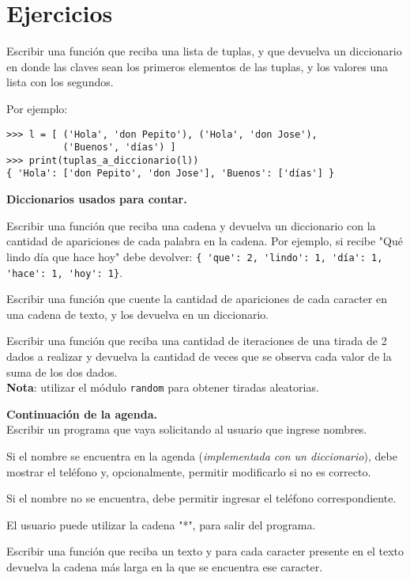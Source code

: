 \newpage
\section{Ejercicios}

\begin{ejercicio}
Escribir una función que reciba una lista de tuplas, y que devuelva
un diccionario en donde las claves sean los primeros elementos de las
tuplas, y los valores una lista con los segundos.

Por ejemplo:
\begin{lstlisting}[numbers=none]
>>> l = [ ('Hola', 'don Pepito'), ('Hola', 'don Jose'),
          ('Buenos', 'días') ]
>>> print(tuplas_a_diccionario(l))
{ 'Hola': ['don Pepito', 'don Jose'], 'Buenos': ['días'] }
\end{lstlisting}
\end{ejercicio}

\begin{ejercicio}
{\bf Diccionarios usados para contar.}
\begin{partes}
  \item Escribir una función que reciba una cadena y devuelva un diccionario con
la cantidad de apariciones de cada palabra en la cadena.  Por ejemplo, si
recibe "Qué lindo día que hace hoy" debe devolver:
\lstinline!{ 'que': 2, 'lindo': 1, 'día': 1, 'hace': 1, 'hoy': 1}!.

  \item Escribir una función que cuente la cantidad de apariciones de cada
caracter en una cadena de texto, y los devuelva en un diccionario.

  \item Escribir una función que reciba una cantidad de iteraciones de una tirada
de 2 dados a realizar y devuelva la cantidad de veces que se observa cada valor
de la suma de los dos dados. \\
{\bf Nota}: utilizar el módulo \verb!random! para obtener tiradas aleatorias.
\end{partes}
\end{ejercicio}

\begin{ejercicio}
{\bf Continuación de la agenda.} \\
Escribir un programa que vaya solicitando al usuario que ingrese nombres.
\begin{partes}
  \item Si el nombre se encuentra en la agenda (\emph{implementada con un
diccionario}), debe mostrar el teléfono y, opcionalmente, permitir
modificarlo si no es correcto.
  \item Si el nombre no se encuentra, debe permitir ingresar el teléfono
correspondiente.
\end{partes}
El usuario puede utilizar la cadena "*", para salir del programa.
\end{ejercicio}

\begin{ejercicio}
Escribir una función que reciba un texto y para cada caracter presente en el
texto devuelva la cadena más larga en la que se encuentra ese caracter.
\end{ejercicio}

